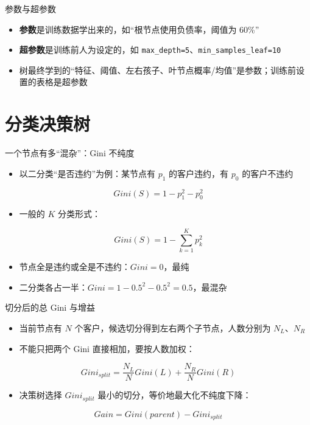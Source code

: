\documentclass[10pt,aspectratio=43]{beamer}
\begin{document}
\begin{frame}{参数与超参数}
  \vfill
  \begin{itemize}
    \item \textbf{参数}是训练数据学出来的，如“根节点使用负债率，阈值为 60\%”
    \item \textbf{超参数}是训练前人为设定的，如 \texttt{max\_depth=5}、\texttt{min\_samples\_leaf=10}
    \item 树最终学到的“特征、阈值、左右孩子、叶节点概率/均值”是参数；训练前设置的表格是超参数
  \end{itemize}
  \vfill
\end{frame}

\section{分类决策树}

\begin{frame}{一个节点有多“混杂”：Gini 不纯度}
  \begin{itemize}
    \item 以二分类“是否违约”为例：某节点有 $p_1$ 的客户违约，有 $p_0$ 的客户不违约
  \end{itemize}
  \[
    Gini(S)=1-p_1^2-p_0^2
  \]
  \begin{itemize}
    \item 一般的 $K$ 分类形式：
  \end{itemize}
  \[
    Gini(S)=1-\sum_{k=1}^{K}p_k^2
  \]
  \begin{itemize}
    \item 节点全是违约或全是不违约：$Gini=0$，最纯
    \item 二分类各占一半：$Gini=1-0.5^2-0.5^2=0.5$，最混杂
  \end{itemize}
\end{frame}

\begin{frame}{切分后的总 Gini 与增益}
  \begin{itemize}
    \item 当前节点有 $N$ 个客户，候选切分得到左右两个子节点，人数分别为 $N_L$、$N_R$
    \item 不能只把两个 Gini 直接相加，要按人数加权：
  \end{itemize}
  \[
    Gini_{split}=\frac{N_L}{N}Gini(L)+\frac{N_R}{N}Gini(R)
  \]
  \begin{itemize}
    \item 决策树选择 $Gini_{split}$ 最小的切分，等价地最大化不纯度下降：
  \end{itemize}
  \[
    Gain=Gini(parent)-Gini_{split}
  \]
\end{frame}
\end{document}
